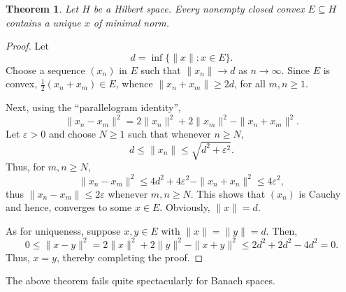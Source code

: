 \documentclass[11pt]{article}
\theoremstyle{thmstyle}
\newtheorem{theorem}{Theorem}[section]
\theoremstyle{defstyle}
\renewcommand{\le}{\leqslant}
\renewcommand{\ge}{\geqslant}
\begin{document}
\begin{theorem}
    Let $H$ be a Hilbert space. Every nonempty closed convex $E\subseteq H$ contains a unique $x$ of minimal norm.
\end{theorem}
\begin{proof}
    Let 
    \begin{equation*}
        d = \inf\{\|x\|\colon x\in E\}.
    \end{equation*}
    Choose a sequence $(x_n)$ in $E$ such that $\|x_n\|\to d$ as $n\to\infty$. Since $E$ is convex, $\frac{1}{2}(x_n + x_m)\in E$, whence $\|x_n + x_m\|\ge 2d$, for all $m,n\ge 1$.

    Next, using the ``parallelogram identity'', 
    \begin{equation*}
        \|x_n - x_m\|^2  = 2\|x_n\|^2 + 2\|x_m\|^2 - \|x_n + x_m\|^2.
    \end{equation*}
    Let $\varepsilon > 0$ and choose $N\ge 1$ such that whenever $n\ge N$, 
    \begin{equation*}
        d\le \|x_n\|\le\sqrt{d^2 + \varepsilon^2}.
    \end{equation*}
    Thus, for $m,n\ge N$, 
    \begin{equation*}
        \|x_n - x_m\|^2\le 4d^2 + 4\varepsilon^2 - \|x_n + x_n\|^2\le 4\varepsilon^2,
    \end{equation*}
    thus $\|x_n - x_m\|\le 2\varepsilon$ whenever $m,n\ge N$. This shows that $(x_n)$ is Cauchy and hence, converges to some $x\in E$. Obviously, $\|x\| = d$.

    As for uniqueness, suppose $x,y\in E$ with $\|x\| = \|y\| = d$. Then, 
    \begin{equation*}
        0\le \|x - y\|^2 = 2\|x\|^2 + 2\|y\|^2 - \|x + y\|^2\le 2d^2 + 2d^2 - 4d^2 = 0.
    \end{equation*}
    Thus, $x = y$, thereby completing the proof.
\end{proof}

The above theorem fails quite spectacularly for Banach spaces.
\end{document}
